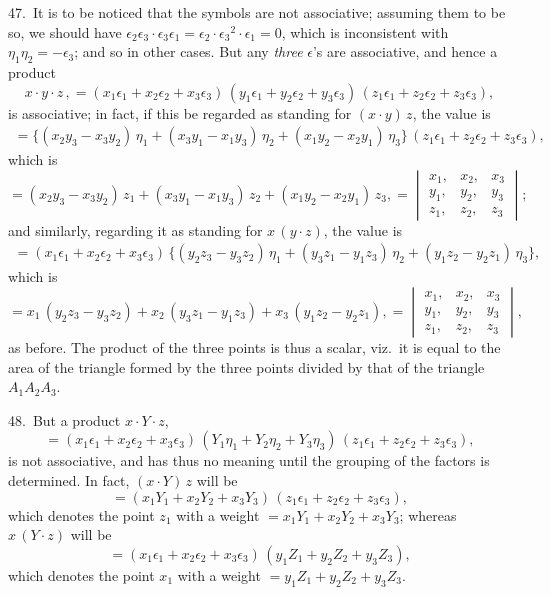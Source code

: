 \documentclass[12pt,a4paper]{article}
\theoremstyle{definition}
\begin{document}
47.\ It is to be noticed that the symbols are not associative; assuming them to
be so, we should have $\epsilon_2 \epsilon_3 \cdot \epsilon_3 \epsilon_1 = \epsilon_2 \cdot \epsilon_3{}^2 \cdot \epsilon_1 = 0$,
which is inconsistent with $\eta_1 \eta_2 = -\epsilon_3$; and so in other cases.
But any \textit{three} $\epsilon$'s are associative, and hence a product
\[
x \cdot y \cdot z \,, = (x_1 \epsilon_1 + x_2 \epsilon_2 + x_3 \epsilon_3)
\, (y_1 \epsilon_1 + y_2 \epsilon_2 + y_3 \epsilon_3)
\, (z_1 \epsilon_1 + z_2 \epsilon_2 + z_3 \epsilon_3),
\]
is associative; in fact, if this be regarded as standing for $(x \cdot y) \, z$, the value is
\begin{multline*}
= \{(x_2 y_3 - x_3 y_2)\, \eta_1 + (x_3 y_1 - x_1 y_3)\, \eta_2 + (x_1 y_2 - x_2 y_1)\, \eta_3\}
\, (z_1 \epsilon_1 + z_2 \epsilon_2 + z_3 \epsilon_3),
\end{multline*}
which is
\[
= (x_2 y_3 - x_3 y_2)\, z_1 + (x_3 y_1 - x_1 y_3)\, z_2 + (x_1 y_2 - x_2 y_1)\, z_3,
= \begin{vmatrix}
x_1, & x_2, & x_3 \\
y_1, & y_2, & y_3 \\
z_1, & z_2, & z_3
\end{vmatrix};
\]
and similarly, regarding it as standing for $x \, (y \cdot z)$, the value is
\begin{multline*}
= (x_1 \epsilon_1 + x_2 \epsilon_2 + x_3 \epsilon_3)\,
\{(y_2 z_3 - y_3 z_2)\, \eta_1 + (y_3 z_1 - y_1 z_3)\, \eta_2 + (y_1 z_2 - y_2 z_1)\, \eta_3\},
\end{multline*}
which is
\[
= x_1 \, (y_2 z_3 - y_3 z_2) + x_2 \, (y_3 z_1 - y_1 z_3) + x_3 \, (y_1 z_2 - y_2 z_1),
= \begin{vmatrix}
x_1, & x_2, & x_3 \\
y_1, & y_2, & y_3 \\
z_1, & z_2, & z_3
\end{vmatrix},
\]
as before. The product of the three points is thus a scalar, viz.\ it is equal to the
area of the triangle formed by the three points divided by that of the triangle
$A_1 A_2 A_3$.

48.\ But a product $x \cdot Y \cdot z$,
\[
= (x_1 \epsilon_1 + x_2 \epsilon_2 + x_3 \epsilon_3)\,
(Y_1 \eta_1 + Y_2 \eta_2 + Y_3 \eta_3)\,
(z_1 \epsilon_1 + z_2 \epsilon_2 + z_3 \epsilon_3),
\]
is not associative, and has thus no meaning until the grouping of the factors is
determined. In fact, $(x \cdot Y)\, z$ will be
\[
= (x_1 Y_1 + x_2 Y_2 + x_3 Y_3)\, (z_1 \epsilon_1 + z_2 \epsilon_2 + z_3 \epsilon_3),
\]
which denotes the point $z_1$ with a weight $= x_1 Y_1 + x_2 Y_2 + x_3 Y_3$;
whereas $x \, (Y \cdot z)$ will be
\[
= (x_1 \epsilon_1 + x_2 \epsilon_2 + x_3 \epsilon_3)\,
(y_1 Z_1 + y_2 Z_2 + y_3 Z_3),
\]
which denotes the point $x_1$ with a weight $= y_1 Z_1 + y_2 Z_2 + y_3 Z_3$.
\end{document}
